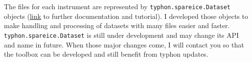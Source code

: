 \documentclass[11pt,a4paper]{article}
\newcommand{\tabitem}{~~\llap{\textbullet}~~}
\begin{document}
The files for each instrument are represented by \texttt{typhon.spareice.Dataset} objects (\href{http://radiativetransfer.org/misc/typhon/doc-trunk/tutorials/dataset.html}{link} to further documentation and tutorial). I developed those objects to make handling and processing of datasets with many files easier and faster. \texttt{typhon.spareice.Dataset} is still under development and may change its API and name in future. When those major changes come, I will contact you so that the \cloud toolbox can be developed and still benefit from typhon updates.

\end{document}

